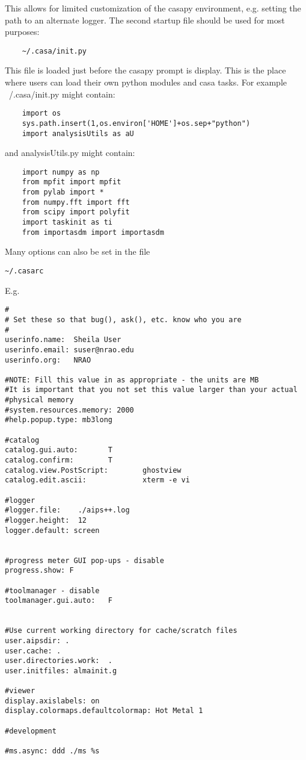 This allows for limited customization of the casapy environment,
e.g. setting the path to an alternate logger. The second startup file
should be used for most purposes:

\small
\begin{verbatim}
	~/.casa/init.py
\end{verbatim}
\normalsize

This file is loaded just before the casapy prompt is display. This is
the place where users can load their own python modules and casa
tasks. For example ~/.casa/init.py might contain:

\small
\begin{verbatim}
	import os
	sys.path.insert(1,os.environ['HOME']+os.sep+"python")
	import analysisUtils as aU
\end{verbatim}
\normalsize

and analysisUtils.py might contain:

\small
\begin{verbatim}
	import numpy as np
	from mpfit import mpfit
	from pylab import *
	from numpy.fft import fft
	from scipy import polyfit
	import taskinit as ti
	from importasdm import importasdm
 \end{verbatim}
\normalsize


Many options can also be set in the file 


\small
\begin{verbatim}
~/.casarc
\end{verbatim}
\normalsize

E.g. 

\small
\begin{verbatim}
#
# Set these so that bug(), ask(), etc. know who you are
#
userinfo.name:  Sheila User
userinfo.email: suser@nrao.edu
userinfo.org:   NRAO

#NOTE: Fill this value in as appropriate - the units are MB
#It is important that you not set this value larger than your actual
#physical memory
#system.resources.memory: 2000
#help.popup.type: mb3long

#catalog
catalog.gui.auto:       T
catalog.confirm:        T
catalog.view.PostScript:        ghostview
catalog.edit.ascii:             xterm -e vi

#logger
#logger.file:    ./aips++.log
#logger.height:  12
logger.default: screen


#progress meter GUI pop-ups - disable
progress.show: F

#toolmanager - disable
toolmanager.gui.auto:   F


#Use current working directory for cache/scratch files
user.aipsdir: .
user.cache: .
user.directories.work:  .
user.initfiles: almainit.g

#viewer
display.axislabels: on
display.colormaps.defaultcolormap: Hot Metal 1

#development

#ms.async: ddd ./ms %s
\end{verbatim}
\normalsize


